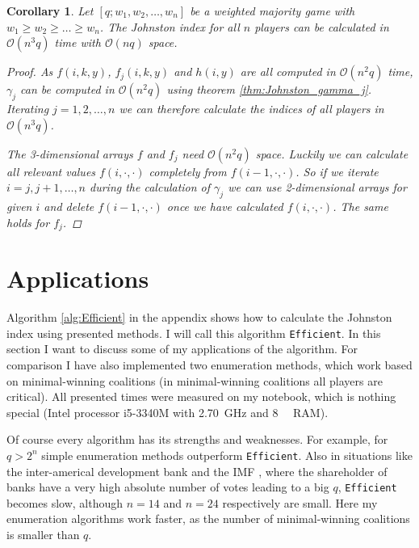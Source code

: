 \documentclass[review]{elsarticle}
\newtheorem{cor}[thm]{Corollary}
\theoremstyle{defn}
\theoremstyle{Pseudo-Code}
\begin{document}
\begin{cor}
 Let $[q;w_1,w_2,\dots,w_n]$ be a weighted majority game with $w_1\geq w_2\geq\dots\geq w_n$.  The Johnston index for all $n$ players can be calculated in $\mathcal{O}(n^3q)$ time with $\mathcal{O}(nq)$ space.
 \begin{proof}
 	As $f(i,k,y)$, $f_j(i,k,y)$ and $h(i,y)$ are all computed in $\mathcal{O}(n^2q)$ time, $\gamma_j$ can be computed in $\mathcal{O}(n^2q)$ using theorem \ref{thm:Johnston_gamma_j}. Iterating $j=1,2,\dots,n$ we can therefore calculate the indices of all players in $\mathcal{O}(n^3q)$.
 	
 	The 3-dimensional arrays $f$ and $f_j$ need $\mathcal{O}(n^2q)$ space. 
 	Luckily we can calculate all relevant values $f(i,\cdot,\cdot)$ completely from $f(i-1,\cdot,\cdot)$. So if we iterate $i=j,j+1,\dots,n$ during the calculation of $\gamma_j$ we can use 2-dimensional arrays for given $i$ and delete $f(i-1,\cdot,\cdot)$ once we have calculated $f(i,\cdot,\cdot)$.
 	The same holds for $f_j$.
 \end{proof}
\end{cor}




\section{Applications}
Algorithm \ref{alg:Efficient} in the appendix shows how to calculate the Johnston index using presented methods.
I will call this algorithm \texttt{Efficient}.
In this section I want to discuss some of my applications of the algorithm.
For comparison I have also implemented two enumeration methods, which work based on minimal-winning coalitions (in minimal-winning coalitions all players are critical).
All presented times were measured on my notebook, which is nothing special (Intel processor i5-3340M with \SI{2.70}{\giga\Hz} and \SI{8}{\giga\byte} RAM). 

Of course every algorithm has its strengths and weaknesses.
For example, for $q> 2^n$ simple enumeration methods outperform \texttt{Efficient}. Also in situations like the inter-americal development bank \citep{Strand2003} and the IMF \citep{Strand2005}, where the shareholder of banks have a very high absolute number of votes leading to a big $q$, \texttt{Efficient} becomes slow, although $n=14$ and $n=24$ respectively are small. Here my enumeration algorithms work faster, as the number of minimal-winning coalitions is smaller than $q$.
\end{document}
